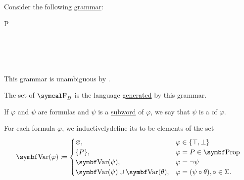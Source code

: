 \begin{definition}\label{def:propositional_language}\mbox{}
  \begin{DefEnum}
     Consider the following \hyperref[def:grammar]{grammar}:
    \begin{bnf*}
         {P \in {}} \\
       {\circ \in \Sigma} \\
          { \bnfor} \\
      \bnfmore             {\bnfts{\( \top \)} \bnfor \bnfts{\( \bot \)} \bnfor} \\
       \\
    \end{bnf*}

    This grammar is unambiguous by .

     The set of  \( \CF_B \) is the language \hyperref[def:grammar_derivation/grammar_language]{generated} by this grammar.

     If \( \varphi \) and \( \psi \) are formulas and \( \psi \) is a \hyperref[def:language/subword]{subword} of \( \varphi \), we say that \( \psi \) is a  of \( \varphi \).

     For each formula \( \varphi \), we inductively\IND define its  to be elements of the set
    \begin{equation}\label{def:propositional_language/var}
      \Bold{Var}(\varphi) \coloneqq \begin{cases}
        \varnothing,                              &\varphi \in \{ \top, \bot \}                     \\
        \{ P \},                                  &\varphi = P \in \Bold{Prop}                      \\
        \Bold{Var}(\psi),                         &\varphi = \neg \psi                              \\
        \Bold{Var}(\psi) \cup \Bold{Var}(\theta), &\varphi = (\psi \circ \theta), \circ \in \Sigma.
      \end{cases}
    \end{equation}
  \end{DefEnum}
\end{definition}

